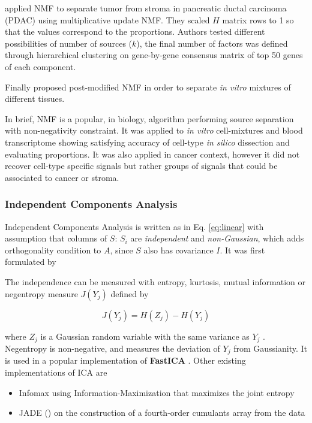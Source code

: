 \documentclass[12pt,]{book}
\providecommand{\tightlist}{%
  \setlength{\itemsep}{0pt}\setlength{\parskip}{0pt}}
\theoremstyle{definition}
\theoremstyle{definition}
\theoremstyle{definition}
\theoremstyle{remark}
\begin{document}
\citet{Moffitt2015} applied NMF to separate tumor from stroma in
pancreatic ductal carcinoma (PDAC) using multiplicative update NMF. They
scaled \(H\) matrix rows to 1 so that the values correspond to the
proportions. Authors tested different possibilities of number of sources
(\(k\)), the final number of factors was defined through hierarchical
clustering on gene-by-gene consensus matrix of top 50 genes of each
component.

Finally \citet{Liu2017} proposed post-modified NMF in order to separate
\emph{in vitro} mixtures of different tissues.

In brief, NMF is a popular, in biology, algorithm performing source
separation with non-negativity constraint. It was applied to \emph{in
vitro} cell-mixtures and blood transcriptome showing satisfying accuracy
of cell-type \emph{in silico} dissection and evaluating proportions. It
was also applied in cancer context, however it did not recover cell-type
specific signals but rather groups of signals that could be associated
to cancer or stroma.

\hypertarget{independent-components-analysis}{%
\subsubsection{Independent Components
Analysis}\label{independent-components-analysis}}

Independent Components Analysis is written as in Eq. \eqref{eq:linear}
with assumption that columns of \(S\): \(S_i\) are \emph{independent}
and \emph{non-Gaussian}, which adds orthogonality condition to \(A\),
since \(S\) also has covariance \(I\). It was first formulated by
\citet{Herault1986}

The independence can be measured with entropy, kurtosis, mutual
information or negentropy measure \(J(Y_j )\) \citep{Hyvarinen2000}
defined by

\begin{equation}
J(Y_j ) = H(Z_j ) − H(Y_j ) \label{eq:negentropy}
\end{equation}

where \(Z_j\) is a Gaussian random variable with the same variance as
\(Y_j\) . Negentropy is non-negative, and measures the deviation of
\(Y_j\) from Gaussianity. It is used in a popular implementation of
\textbf{FastICA} \citep{Hyvarinen2000}. Other existing implementations
of ICA are

\begin{itemize}
\tightlist
\item
  Infomax \citep{Bell1995} using Information-Maximization that maximizes
  the joint entropy
\item
  JADE (\citet{Cardoso1993}) on the construction of a fourth-order
  cumulants array from the data
\end{itemize}
\end{document}
